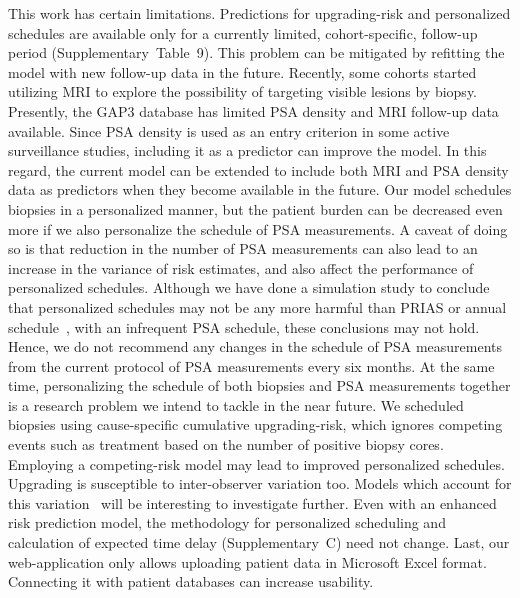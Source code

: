 This work has certain limitations. Predictions for upgrading-risk and personalized schedules are available only for a currently limited, cohort-specific, follow-up period (Supplementary~Table~9). This problem can be mitigated by refitting the model with new follow-up data in the future. Recently, some cohorts started utilizing MRI to explore the possibility of targeting visible lesions by biopsy. Presently, the GAP3 database has limited PSA density and MRI follow-up data available. Since PSA density is used as an entry criterion in some active surveillance studies, including it as a predictor can improve the model. In this regard, the current model can be extended to include both MRI and PSA density data as predictors when they become available in the future. Our model schedules biopsies in a personalized manner, but the patient burden can be decreased even more if we also personalize the schedule of PSA measurements. A caveat of doing so is that reduction in the number of PSA measurements can also lead to an increase in the variance of risk estimates, and also affect the performance of personalized schedules. Although we have done a simulation study to conclude that personalized schedules may not be any more harmful than PRIAS or annual schedule~\citep{tomer2019personalized}, with an infrequent PSA schedule, these conclusions may not hold. Hence, we do not recommend any changes in the schedule of PSA measurements from the current protocol of PSA measurements every six months. At the same time, personalizing the schedule of both biopsies and PSA measurements together is a research problem we intend to tackle in the near future. We scheduled biopsies using cause-specific cumulative upgrading-risk, which ignores competing events such as treatment based on the number of positive biopsy cores. Employing a competing-risk model may lead to improved personalized schedules. Upgrading is susceptible to inter-observer variation too. Models which account for this variation~\citep{coley2017prediction,balasubramanian2003estimation} will be interesting to investigate further. Even with an enhanced risk prediction model, the methodology for personalized scheduling and calculation of expected time delay (Supplementary~C) need not change. Last, our web-application only allows uploading patient data in Microsoft Excel format. Connecting it with patient databases can increase usability.
